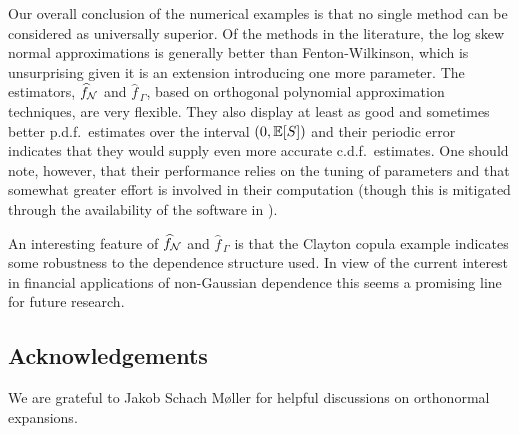 


Our overall conclusion of the numerical examples is that no single method can
be considered as universally superior. Of the methods in the literature,
the log skew normal approximations is generally better than Fenton-Wilkinson,
which is unsurprising given it is an extension introducing one more parameter.
The estimators, $\widehat{f}_{\mathcal{N}}$ and $\widehat{f}_{\,\Gamma}$, based on orthogonal polynomial approximation techniques, are very flexible. They also display at least as good and sometimes better p.d.f.\ estimates over the interval $(0, \operatorname{{\mathbb E}}[S])$ and their periodic error indicates that they would supply even more accurate c.d.f.\ estimates. One should note, however, that their
performance relies on the tuning of parameters and that somewhat
greater effort is involved in their computation (though this is mitigated through the availability
of the software in \cite{Code}).

An interesting feature of $\widehat{f}_{\mathcal{N}}$ and $\widehat{f}_{\,\Gamma}$ is that
the Clayton copula example indicates some robustness to the dependence structure used.
In view of the current interest in financial applications of non-Gaussian dependence this
seems a promising line for future research.

\subsection*{Acknowledgements}
{\small We are grateful to Jakob Schach M\o ller for helpful discussions on orthonormal expansions.}

